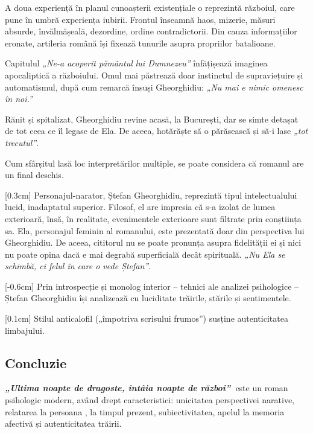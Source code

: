 \documentclass[
12pt,                        %
a4paper                      %
]{article}
\newcommand{\rom}[1]{\uppercase\expandafter{\romannumeral #1\relax}} %
\newcommand{\operatitle}{\textbf{\textit{„Ultima noapte de dragoste, întâia noapte de război”\ }}} %
\begin{document}
A doua experiență în planul cunoașterii existențiale o reprezintă războiul, care pune în umbră experiența iubirii. Frontul înseamnă haos, mizerie, măsuri absurde, învălmășeală, dezordine, ordine contradictorii. Din cauza informațiilor eronate, artileria română își fixează tunurile asupra propriilor batalioane.

Capitulul \textit{„Ne-a acoperit pământul lui Dumnezeu”} înfățișează imaginea apocaliptică a războiului. Omul mai păstrează doar instinctul de supraviețuire și automatismul, după cum remarcă însuși Gheorghidiu: \textit{„Nu mai e nimic omenesc în noi.”}

Rănit și spitalizat, Gheorghidiu revine acasă, la București, dar se simte detașat de tot ceea ce îl legase de Ela. De aceea, hotărăște să o părăsească și să-i lase \textit{„tot trecutul”}.

Cum sfârșitul lasă loc interpretărilor multiple, se poate considera că romanul are un final deschis.

[0.3cm]
Personajul-narator, Ștefan Gheorghidiu, reprezintă tipul intelectualului lucid, inadaptatul superior. Filosof, el are impresia că s-a izolat de lumea exterioară, însă, în realitate, evenimentele exterioare sunt filtrate prin conștiința sa. Ela, personajul feminin al romanului, este prezentată doar din perspectiva lui Gheorghidiu. De aceea, cititorul nu se poate pronunța asupra fidelității ei și nici nu poate opina dacă e mai degrabă superficială decât spirituală. \textit{„Nu Ela se schimbă, ci felul în care o vede Ștefan”}.

[-0.6cm]
Prin introspecție și monolog interior -- tehnici ale analizei psihologice --  Ștefan Gheorghidiu își analizează cu luciditate trăirile, stările și sentimentele.

[0.1cm]
Stilul anticalofil („împotriva scrisului frumos”) susține autenticitatea limbajului.

\subsection{Concluzie}

\operatitle este un roman psihologic modern, având drept caracteristici: unicitatea perspectivei narative, relatarea la persoana \rom{1}, la timpul prezent, subiectivitatea, apelul la memoria afectivă și autenticitatea trăirii.
\end{document}

